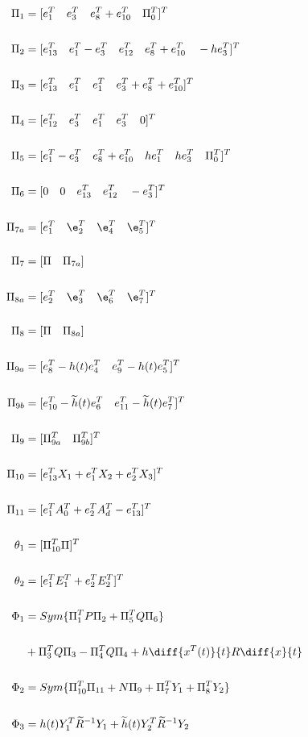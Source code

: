 \documentclass[journal]{IEEEtran}
\begin{document}
 \begin{align}
 \Pi _1 &= [e_1^T \quad e_3^T \quad e_8^T+e_{10}^T \quad \Pi_0^T]^T \\ \\
 \Pi _2 &= [e_{13}^T \quad e_1^T-e_3^T \quad e_{12}^T \quad e_{8}^T+e_{10}^T \quad -he_3^T]^T \\ \\
 \Pi _3 &= [e_{13}^T \quad e_1^T \quad e_{1}^T \quad e_{3}^T+e_{8}^T +e_{10}^T]^T \\ \\
 \Pi _4 &= [e_{12}^T \quad e_3^T \quad e_{1}^T \quad e_{3}^T \quad 0]^T \\ \\
 \Pi _5 &= [e_{1}^T - e_3^T \quad e_{8}^T + e_{10}^T \quad he_{1}^T \quad he_3^T \quad \Pi _0^T]^T \\ \\
 \Pi _6 &= [0 \quad 0 \quad e_{13}^T \quad e_{12}^T \quad -e^T_3]^T \\ \\  
 \Pi _{7a} &= [e_1^T \quad \e_2^T \quad \e_4^T \quad \e_5^T]^T \\ \\
 \Pi _7 &= [\Pi\quad \Pi _{7a} ]\\ \\
 \Pi _{8a} &= [e_2^T \quad \e_3^T \quad \e_6^T \quad \e_7^T]^T \\ \\ 
 \Pi _8 &= [\Pi \quad \Pi _{8a} ] \\ \\
 \Pi _{9a} &= [e_8^T -h(t)e^T_4 \quad e^T_9 - h(t)e^T_5]^T \\ \\
 \Pi _{9b} &= [e_{10}^T -\widetilde{h}(t)e^T_6 \quad e^T_{11} - \widetilde{h}(t)e^T_7]^T \\ \\
 \Pi _{9} &= [\Pi _{9a}^T \quad \Pi _{9b}^T]^T \\ \\
 \Pi _{10} &= [e^T_{13}X_1+e_1^TX_2 + e_2^TX_3]^T \\ \\
 \Pi _{11} &= [e^T_{1}A_0^T+e_2^TA_d^T - e_{13}^T]^T \\ \\
 \theta _1 &= [\Pi _{10}^T \Pi]^T \\ \\
 \theta _2 &= [e_1^TE_1^T + e_2^TE_2^T]^T \\ \\
 \Phi _1 &= Sym\{\Pi _1^TP\Pi _2 + \Pi _5^TQ\Pi  _6\}  \\ \\
         &+ \Pi _3^TQ\Pi _3 - \Pi _4^TQ\Pi _4 + h\diff{x^T(t)}{t}R\diff{x}{t} \\ \\
 \Phi _2 &= Sym\{\Pi _{10}^T\Pi _{11} + N\Pi _{9}+\Pi  _7^TY_1 +\Pi_8^TY_2\}  \\ \\
 \Phi _3 &= h(t)Y_1^T\widetilde{R}^{-1}Y_1+\widetilde{h}(t)Y_2^T\widetilde{R}^{-1}Y_2
 \end{align}
\end{document}
